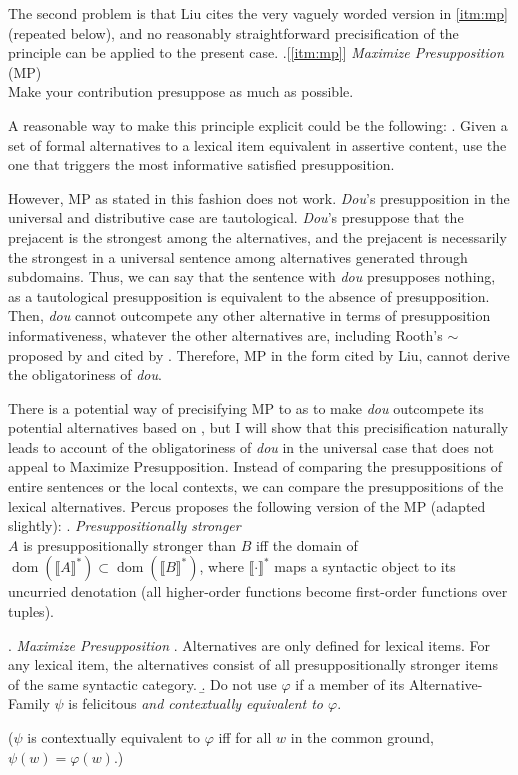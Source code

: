 \documentclass[12pt]{article}
\DeclareMathOperator{\dom}{dom}
\begin{document}
The second problem is that Liu cites the very vaguely worded version in \cref{itm:mp} (repeated below), and no reasonably straightforward precisification of the principle can be applied to the present case.
\ex.[\cref{itm:mp}] \emph{Maximize Presupposition} (MP)\\
Make your contribution presuppose as much as possible. 

A reasonable way to make this principle explicit could be the following:
\ex. Given a set of formal alternatives to a lexical item equivalent in assertive content, use the one that triggers the most informative satisfied presupposition.

However, MP as stated in this fashion does not work.
\emph{Dou}'s presupposition in the universal and distributive case are tautological.
\emph{Dou}'s presuppose that the prejacent is the strongest among the alternatives, and the prejacent is necessarily the strongest in a universal sentence among alternatives generated through subdomains.
Thus, we can say that the sentence with \emph{dou} presupposes nothing, as a tautological presupposition is equivalent to the absence of presupposition.
Then, \emph{dou} cannot outcompete any other alternative in terms of presupposition informativeness, whatever the other alternatives are, including Rooth's \(\sim\) proposed by \citet{singhModularityLocalityInterpretation2008} and cited by \citet{liuPragmaticExplanationMeidou2021}.
Therefore, MP in the form cited by Liu, cannot derive the obligatoriness of \emph{dou}.

There is a potential way of precisifying MP to as to make \emph{dou} outcompete its potential alternatives based on \citet{percusAntipresuppositions2006}, but I will show that this precisification naturally leads to account of the obligatoriness of \emph{dou} in the universal case that does not appeal to Maximize Presupposition.
Instead of comparing the presuppositions of entire sentences or the local contexts, we can compare the presuppositions of the lexical alternatives.
Percus proposes the following version of the MP (adapted slightly):
\ex. \emph{Presuppositionally stronger}\\
\(A\) is presuppositionally stronger than \(B\) iff the domain of \(\dom(\llbracket A \rrbracket^*) \subset \dom(\llbracket B \rrbracket^*)\), where \(\llbracket \cdot \rrbracket^*\) maps a syntactic object to its uncurried denotation (all higher-order functions become first-order functions over tuples).

\ex. \emph{Maximize Presupposition}
\a. Alternatives are only defined for lexical items. For any lexical item, the alternatives consist of all presuppositionally stronger items of the same syntactic category.
\b. Do not use \(\varphi\) if a member of its Alternative-Family \(\psi\) is felicitous \emph{and contextually equivalent to \(\varphi\)}.\\
\strut \hfill (\(\psi\) is contextually equivalent to \(\varphi\) iff for all \(w\) in the common ground, \(\psi(w) = \varphi(w)\).)
\end{document}
